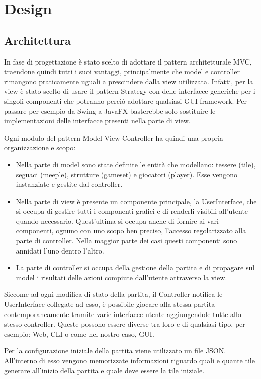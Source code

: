 \section{Design}
\subsection{Architettura}
In fase di progettazione è stato scelto di adottare il pattern architetturale MVC, traendone quindi tutti i suoi vantaggi, principalmente che model e controller rimangono praticamente uguali a prescindere dalla view utilizzata. Infatti, per la view è stato scelto di usare il pattern Strategy con delle interfacce generiche per i singoli componenti che potranno perciò adottare qualsiasi GUI framework. Per passare per esempio da Swing a JavaFX basterebbe solo sostituire le implementazioni delle interfacce presenti nella parte di view.
\medskip

Ogni modulo del pattern Model-View-Controller ha quindi una propria organizzazione e scopo:
\begin{itemize}
    \item Nella parte di model sono state definite le entità che modellano: tessere (tile), seguaci (meeple), strutture (gameset) e giocatori (player). Esse vengono instanziate e gestite dal controller.
    \item Nella parte di view è presente un componente principale, la UserInterface, che si occupa di gestire tutti i componenti grafici e di renderli visibili all'utente quando necessario. Quest'ultima si occupa anche di fornire ai vari componenti, ognuno con uno scopo ben preciso, l'accesso regolarizzato alla parte di controller. Nella maggior parte dei casi questi componenti sono annidati l'uno dentro l'altro.
    \item La parte di controller si occupa della gestione della partita e di propagare sul model i risultati delle azioni compiute dall'utente attraverso la view.
\end{itemize}
Siccome ad ogni modifica di stato della partita, il Controller notifica le UserInterface collegate ad esso, è possibile giocare alla stessa partita contemporaneamente tramite varie interfacce utente aggiungendole tutte allo stesso controller. Queste possono essere diverse tra loro e di qualsiasi tipo, per esempio: Web, CLI o come nel nostro caso, GUI.
\medskip

Per la configurazione iniziale della partita viene utilizzato un file JSON. All'interno di esso vengono memorizzate informazioni riguardo quali e quante tile generare all'inizio della partita e quale deve essere la tile iniziale.

